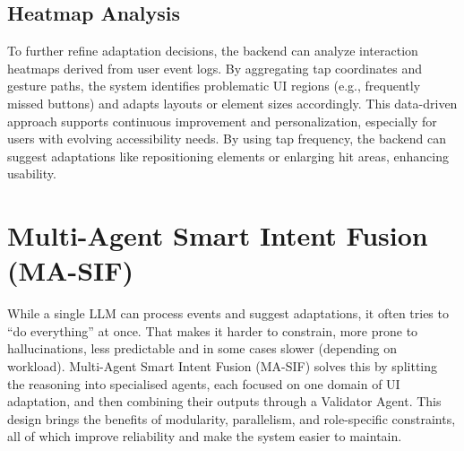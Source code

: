 \subsection{Heatmap Analysis}

To further refine adaptation decisions, the backend can analyze interaction heatmaps derived from user event logs. By aggregating tap coordinates and gesture paths, the system identifies problematic UI regions (e.g., frequently missed buttons) and adapts layouts or element sizes accordingly. This data-driven approach supports continuous improvement and personalization, especially for users with evolving accessibility needs. By using tap frequency, the backend can suggest adaptations like repositioning elements or enlarging hit areas, enhancing usability.

\section{Multi-Agent Smart Intent Fusion (MA-SIF)}
While a single LLM can process events and suggest adaptations, it often tries to “do everything” at once.
That makes it harder to constrain, more prone to hallucinations, less predictable and in some cases slower (depending on workload).
Multi-Agent Smart Intent Fusion (MA-SIF) solves this by splitting the reasoning into specialised agents, each focused on one domain of UI adaptation, and then combining their outputs through a Validator Agent.
This design brings the benefits of modularity, parallelism, and role-specific constraints, all of which improve reliability and make the system easier to maintain.

